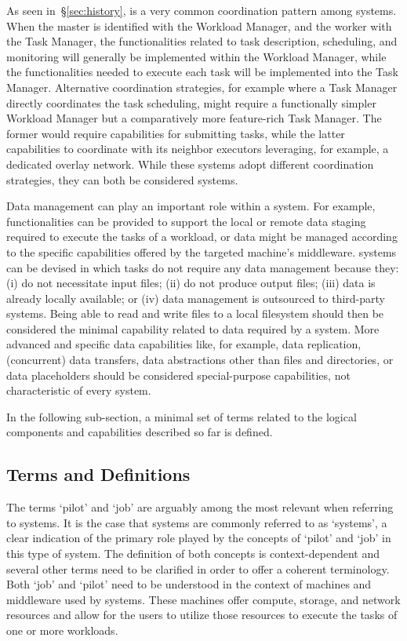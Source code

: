\documentclass{sig-alternate}
\begin{document}
As seen in~\S\ref{sec:history}, \MW is a very common coordination pattern among
\pilotjob systems. When the master is identified with the Workload Manager, and
the worker with the Task Manager, the functionalities related to task
description, scheduling, and monitoring will generally be implemented within the
Workload Manager, while the functionalities needed to execute each task will be
implemented into the Task Manager. Alternative coordination strategies, for
example where a Task Manager directly coordinates the task scheduling, might
require a functionally simpler Workload Manager but a comparatively more
feature-rich Task Manager. The former would require capabilities for submitting
tasks, while the latter capabilities to coordinate with its neighbor executors
leveraging, for example, a dedicated overlay network. While these systems adopt
different coordination strategies, they can both be considered \pilotjob
systems.

Data management can play an important role within a \pilotjob system. For
example, functionalities can be provided to support the local or remote data
staging required to execute the tasks of a workload, or data might be managed
according to the specific capabilities offered by the targeted machine's
middleware. \pilotjob systems can be devised in which tasks do not require any
data management because they: (i) do not necessitate input files; (ii) do not
produce output files; (iii) data is already locally available; or (iv) data
management is outsourced to third-party systems. Being able to read and write
files to a local filesystem should then be considered the minimal capability
related to data required by a \pilotjob system. More advanced and specific data
capabilities like, for example, data replication, (concurrent) data transfers,
data abstractions other than files and directories, or data placeholders should
be considered special-purpose capabilities, not characteristic of every
\pilotjob system.

In the following sub-section, a minimal set of terms related to the logical
components and capabilities described so far is defined.

\subsection{Terms and Definitions}
\label{sec:termsdefs}

 The terms `pilot' and `job' are arguably
among the most relevant when referring to \pilotjob systems. It is the case that
\pilotjob systems are commonly referred to as `\pilotjob systems', a clear
indication of the primary role played by the concepts of `pilot' and `job' in
this type of system. The definition of both concepts is context-dependent and
several other terms need to be clarified in order to offer a coherent
terminology. Both `job' and `pilot' need to be understood in the context of
machines and middleware used by \pilotjob systems. These machines offer compute,
storage, and network resources and \pilots allow for the users to utilize those
resources to execute the tasks of one or more workloads.
\end{document}
